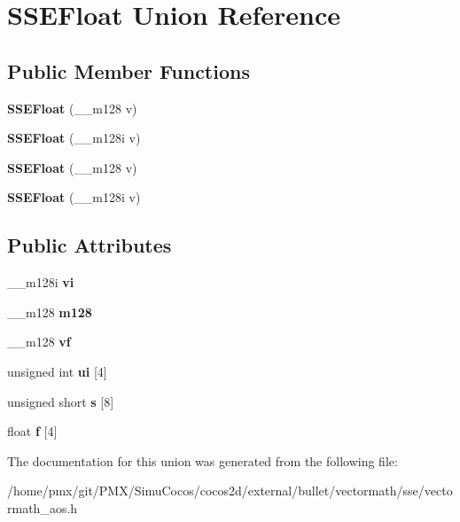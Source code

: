 \hypertarget{unionSSEFloat}{}\section{S\+S\+E\+Float Union Reference}
\label{unionSSEFloat}
\subsection*{Public Member Functions}
\begin{DoxyCompactItemize}
\item 
\mbox{\label{unionSSEFloat_a5338f71202408d7521712695b644fe92}} 
{\bfseries S\+S\+E\+Float} (\+\_\+\+\_\+m128 v)
\item 
\mbox{\label{unionSSEFloat_a31b48cfb8af4d4b843a0a20535360ee1}} 
{\bfseries S\+S\+E\+Float} (\+\_\+\+\_\+m128i v)
\item 
\mbox{\label{unionSSEFloat_a5338f71202408d7521712695b644fe92}} 
{\bfseries S\+S\+E\+Float} (\+\_\+\+\_\+m128 v)
\item 
\mbox{\label{unionSSEFloat_a31b48cfb8af4d4b843a0a20535360ee1}} 
{\bfseries S\+S\+E\+Float} (\+\_\+\+\_\+m128i v)
\end{DoxyCompactItemize}
\subsection*{Public Attributes}
\begin{DoxyCompactItemize}
\item 
\mbox{\label{unionSSEFloat_a6b8f496a26c177ab482ccb8a36c73ddb}} 
\+\_\+\+\_\+m128i {\bfseries vi}
\item 
\mbox{\label{unionSSEFloat_a43b3ec91b2407216ad6f50dbb40969b1}} 
\+\_\+\+\_\+m128 {\bfseries m128}
\item 
\mbox{\label{unionSSEFloat_a8fcfcd25220108144aa83e3161ff71eb}} 
\+\_\+\+\_\+m128 {\bfseries vf}
\item 
\mbox{\label{unionSSEFloat_a421b4527607cd8b7de76b6904f1fc46b}} 
unsigned int {\bfseries ui} \mbox{[}4\mbox{]}
\item 
\mbox{\label{unionSSEFloat_af332f9bf013c8674045f1389cbf1c3ca}} 
unsigned short {\bfseries s} \mbox{[}8\mbox{]}
\item 
\mbox{\label{unionSSEFloat_af89f711ad3fcfe557a9535f6752bef72}} 
float {\bfseries f} \mbox{[}4\mbox{]}
\end{DoxyCompactItemize}


The documentation for this union was generated from the following file\+:\begin{DoxyCompactItemize}
\item 
/home/pmx/git/\+P\+M\+X/\+Simu\+Cocos/cocos2d/external/bullet/vectormath/sse/vectormath\+\_\+aos.\+h\end{DoxyCompactItemize}
